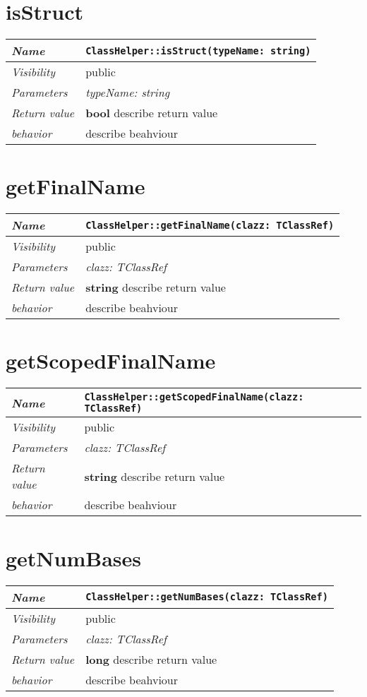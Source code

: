 \section{isStruct}
\begin{longtable}{p{3cm} @{\hskip 1cm} p{12cm}}
 \hline
\textit{Name} & \texttt{ClassHelper::isStruct(typeName: string)}\\
\hline
 \textit{Visibility} & public\\
\hline
\textit{Parameters} & \textit{typeName: string}\\
\hline
\textit{Return value} & \textbf{ bool} describe return value\\
  \hline
 \textit{behavior} & describe beahviour \\
\hline
\end{longtable} \pagebreak
 \section{getFinalName}
\begin{longtable}{p{3cm} @{\hskip 1cm} p{12cm}}
 \hline
\textit{Name} & \texttt{ClassHelper::getFinalName(clazz: TClassRef)}\\
\hline
 \textit{Visibility} & public\\
\hline
\textit{Parameters} & \textit{clazz: TClassRef}\\
\hline
\textit{Return value} & \textbf{ string} describe return value\\
  \hline
 \textit{behavior} & describe beahviour \\
\hline
\end{longtable} \pagebreak
 \section{getScopedFinalName}
\begin{longtable}{p{3cm} @{\hskip 1cm} p{12cm}}
 \hline
\textit{Name} & \texttt{ClassHelper::getScopedFinalName(clazz: TClassRef)}\\
\hline
 \textit{Visibility} & public\\
\hline
\textit{Parameters} & \textit{clazz: TClassRef}\\
\hline
\textit{Return value} & \textbf{ string} describe return value\\
  \hline
 \textit{behavior} & describe beahviour \\
\hline
\end{longtable} \pagebreak
 \section{getNumBases}
\begin{longtable}{p{3cm} @{\hskip 1cm} p{12cm}}
 \hline
\textit{Name} & \texttt{ClassHelper::getNumBases(clazz: TClassRef)}\\
\hline
 \textit{Visibility} & public\\
\hline
\textit{Parameters} & \textit{clazz: TClassRef}\\
\hline
\textit{Return value} & \textbf{ long} describe return value\\
  \hline
 \textit{behavior} & describe beahviour \\
\hline
\end{longtable} \pagebreak
